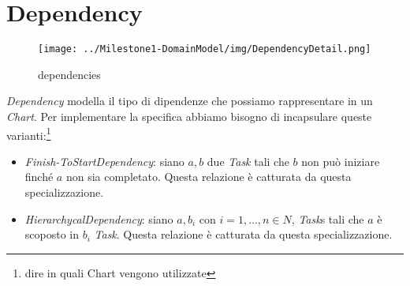 \section{Dependency}
\label{sec:dependency}

\begin{figure}[h!] 
	\centering
	\texttt{[image: ../Milestone1-DomainModel/img/DependencyDetail.png]}
	\caption{dependencies}
	\label{fig:dependencies} 
\end{figure}

\emph{Dependency} modella il tipo di dipendenze che possiamo rappresentare in
un \emph{Chart}. Per implementare la specifica abbiamo bisogno di incapsulare
queste varianti:\footnote{dire in quali Chart vengono utilizzate}
\begin{itemize}
  \item \emph{Finish-ToStartDependency}: siano $a, b$ due \emph{Task} tali
  che $b$ non pu\`o iniziare finch\'e $a$ non sia completato. Questa relazione
  \`e catturata da questa specializzazione.
  \item \emph{HierarchycalDependency}: siano $a, b_{i}$ con $i= 1,\ldots,n \in
  N$, \emph{Task}s tali che $a$ \`e scoposto in $b_{i}$ \emph{Task}. Questa
  relazione \`e catturata da questa specializzazione.
\end{itemize}